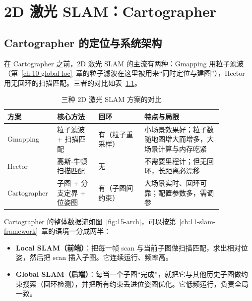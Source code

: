 \usetikzlibrary{arrows.meta, positioning}

\chapter{2D 激光 SLAM：Cartographer}\label{ch:15-cartographer}


\section{Cartographer 的定位与系统架构}\label{sec:15-arch}

在 Cartographer 之前，2D 激光 SLAM 的主流有两种：Gmapping\cite{grisetti2007gmapping} 用粒子滤波（第~\ref{ch:10-global-loc}~章的粒子滤波在这里被用来``同时定位与建图''），Hector 用无回环的扫描匹配。三者的对比如表~\ref{tab:15-compare}。

\begin{table}[htbp]
  \centering
  \caption{三种 2D 激光 SLAM 方案的对比}\label{tab:15-compare}
  \footnotesize
  \begin{tabular}{p{0.14\linewidth}p{0.18\linewidth}p{0.20\linewidth}p{0.34\linewidth}}
    \toprule
    方案 & 核心方法 & 回环 & 特点与局限 \\
    \midrule
    Gmapping & 粒子滤波 + 扫描匹配 & 有（粒子重采样） & 小场景效果好；粒子数随地图增大而增多，大场景计算与内存吃紧 \\
    Hector & 高斯-牛顿扫描匹配 & 无 & 不需要里程计；但无回环，长距离必漂移 \\
    Cartographer & 子图 + 分支定界 + 位姿图 & 有（子图间约束） & 大场景实时、回环可靠；配置参数多，需调参 \\
    \bottomrule
  \end{tabular}
\end{table}

Cartographer 的整体数据流如图~\ref{fig:15-arch}，可以按第~\ref{ch:11-slam-framework}~章的语境一分成两半：
\begin{itemize}
  \item \textbf{Local SLAM（前端）}：把每一帧 scan 与当前子图做扫描匹配，求出相对位姿，然后把 scan 插入子图。它连续运行、频率高。
  \item \textbf{Global SLAM（后端）}：每当一个子图``完成''，就把它与其他历史子图做约束搜索（回环检测），并把所有约束丢进位姿图优化。它低频运行，负责全局一致。
\end{itemize}

